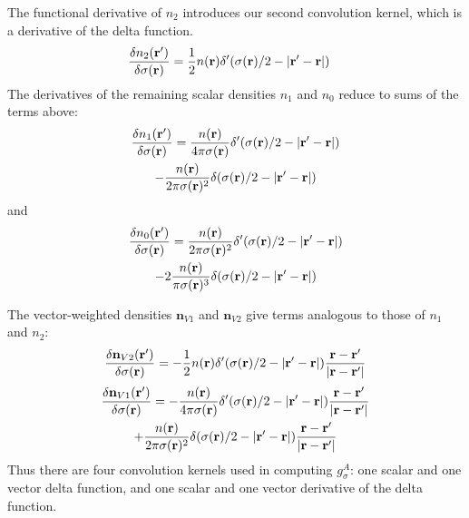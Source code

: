 The functional derivative of $n_2$ introduces our second convolution
kernel, which is a derivative of the delta function.
\begin{align}
  \frac{\delta n_2(\textbf{r}')}{\delta \sigma(\textbf{r})} &= \frac 12 n(\textbf{r}) \delta'(\sigma(\textbf{r})/2 -\left|\textbf{r}' - \textbf{r}\right|)
\end{align}
The derivatives of the remaining scalar densities $n_1$ and $n_0$ reduce to
sums of the terms above:
\begin{multline}
  \frac{\delta n_1(\textbf{r}')}{\delta \sigma(\textbf{r})}
  = \frac{n(\textbf{r})}{4\pi
    \sigma(\textbf{r})}\delta'(\sigma(\textbf{r})/2 -\left|\textbf{r}' - \textbf{r}\right|) \\
  -
  \frac{n(\textbf{r})}{2\pi
    \sigma(\textbf{r})^2}\delta(\sigma(\textbf{r})/2 -\left|\textbf{r}' - \textbf{r}\right|)
\end{multline}
and
\begin{multline}
  \frac{\delta n_0(\textbf{r}')}{\delta \sigma(\textbf{r})}
  = \frac{n(\textbf{r})}{2\pi
    \sigma(\textbf{r})^2}\delta'(\sigma(\textbf{r})/2 -\left|\textbf{r}' - \textbf{r}\right|)
  \\-
  2 \frac{n(\textbf{r})}{\pi
    \sigma(\textbf{r})^3}\delta(\sigma(\textbf{r})/2 -\left|\textbf{r}' - \textbf{r}\right|)
\end{multline}

The vector-weighted densities $\mathbf{n}_{V1}$ and $\mathbf{n}_{V2}$
give terms analogous to those of $n_1$ and $n_2$:
\begin{multline}
  \frac{\delta \mathbf{n}_{V2}(\textbf{r}')}{\delta \sigma(\textbf{r})} = -\frac 12 n(\textbf{r}) \delta'(\sigma(\textbf{r})/2 -\left|\textbf{r}' - \textbf{r}\right|)
    \frac{\textbf{r}-\textbf{r}'}{|\textbf{r}-\textbf{r}'|}
\end{multline}
\begin{multline}
  \frac{\delta \mathbf{n}_{V1}(\textbf{r}')}{\delta \sigma(\textbf{r})}
  = -\frac{n(\textbf{r})}{4\pi
    \sigma(\textbf{r})}\delta'(\sigma(\textbf{r})/2 -\left|\textbf{r}' - \textbf{r}\right|) \frac{\textbf{r}-\textbf{r}'}{|\textbf{r}-\textbf{r}'|}
  \\ +
  \frac{n(\textbf{r})}{2\pi
    \sigma(\textbf{r})^2}\delta(\sigma(\textbf{r})/2 -\left|\textbf{r}' - \textbf{r}\right|) \frac{\textbf{r}-\textbf{r}'}{|\textbf{r}-\textbf{r}'|}
\end{multline}
Thus there are four convolution kernels used in computing $g_\sigma^A$:
one scalar and one vector delta function, and one scalar and one
vector derivative of the delta function.
